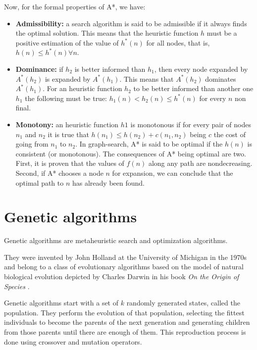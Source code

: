 \documentclass[]{llncs}
\begin{document}
Now, for the formal properties of A*, we have:
\begin{itemize}
    \item \textbf{Admissibility:} a search algorithm is said to be admissible if it always finds the optimal solution. This means that the heuristic function $h$ must be a positive estimation of the value of $h^{*}(n)$ for all nodes, that is, $h(n) \leq h^{*}(n) \forall n$. 
    \item \textbf{Dominance:} if $h_2$ is better informed than $h_1$, then every node expanded by $A^{*}(h_2)$ is expanded by $A^{*}(h_1)$. This means that $A^{*}(h_2)$ dominates $A^{*}(h_1)$. For an heuristic function $h_2$ to be better informed than another one $h_1$ the following must be true: $h_1(n) < h_2(n) \leq h^{*}(n)$ for every $n$ non final.
    \item \textbf{Monotony:} an heuristic function $h1$ is monotonous if for every pair of nodes $n_1$ and $n_2$ it is true that $h(n_1) \leq h(n_2) + c(n_1, n_2)$ being $c$ the cost of going from $n_1$ to $n_2$. In graph-search, A* is said to be optimal if the $h(n)$ is consistent (or monotonous). The consequences of A* being optimal are two. First, it is proven that the values of $f(n)$ along any path are nondecreasing. Second, if A* chooses a node $n$ for expansion, we can conclude that the optimal path to $n$ has already been found.
\end{itemize}
\section{Genetic algorithms}\label{gen_algs}
Genetic algorithms \cite{artificial-intelligence-2,essentials-metaheuristics,ag-tutorial} are metaheuristic search and optimization algorithms.

They were invented by John Holland at the University of Michigan in the 1970s and belong to a class of evolutionary algorithms based on the model of natural biological evolution depicted by Charles Darwin in his book \textit{On the Origin of Species} \cite{darwin}. 

Genetic algorithms start with a set of $k$ randomly generated states, called the population. They perform the evolution of that population, selecting the fittest individuals to become the parents of the next generation and generating children from those parents until there are enough of them. This reproduction process is done using crossover and mutation operators.
\end{document}
